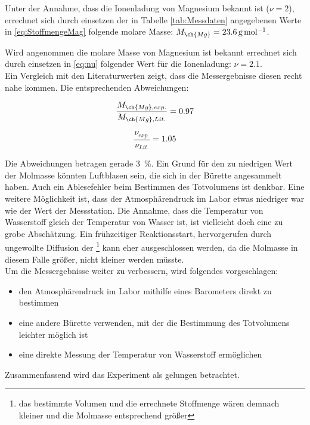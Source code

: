 \documentclass{article}
\begin{document}
    Unter der Annahme, dass die Ionenladung von Magnesium bekannt ist ($\nu=2$), errechnet sich durch einsetzen der in Tabelle \ref{tab:Messdaten} angegebenen Werte in \ref{eq:StoffmengeMag} folgende molare Masse: $M_{\ch{Mg}}=\SI[mode=text]{23.6}{\gram\per\mole}$.
    
    Wird angenommen die molare Masse von Magnesium ist bekannt errechnet sich durch einsetzen in \ref{eq:nu} folgender Wert für die Ionenladung: $\nu=2.1$. \\
    
    Ein Vergleich mit den Literaturwerten zeigt, dass die Messergebnisse diesen recht nahe kommen. Die entsprechenden Abweichungen: 
    
    \begin{equation}
      \frac{M_{\ch{Mg},exp.}}{M_{\ch{Mg},Lit.}}=0.97
    \end{equation}
      
    \begin{equation}
      \frac{\nu_{exp.}}{\nu_{Lit.}}=1.05
    \end{equation}
    
    Die Abweichungen betragen gerade \SI[mode=text]{3}{\percent}. Ein Grund für den zu niedrigen Wert der Molmasse könnten Luftblasen sein, die sich in der Bürette angesammelt haben. Auch ein Ablesefehler beim Bestimmen des Totvolumens ist denkbar. Eine weitere Möglichkeit ist, dass der Atmosphärendruck im Labor etwas niedriger war wie der Wert der Messstation. Die Annahme, dass die Temperatur von Wasserstoff gleich der Temperatur von Wasser ist, ist vielleicht doch eine zu grobe Abschätzung. Ein frühzeitiger Reaktionsstart, hervorgerufen durch ungewollte Diffusion der \footnote{das bestimmte Volumen und die errechnete Stoffmenge wären demnach kleiner und die Molmasse entsprechend größer} kann eher ausgeschlossen werden, da die Molmasse in diesem Falle größer, nicht kleiner werden müsste. \\
    
    Um die Messergebnisse weiter zu verbessern, wird folgendes vorgeschlagen:
    
    \begin{itemize}
      \item den Atmosphärendruck im Labor mithilfe eines Barometers direkt zu bestimmen
      \item eine andere Bürette verwenden, mit der die Bestimmung des Totvolumens leichter möglich ist
      \item eine direkte Messung der Temperatur von Wasserstoff ermöglichen
    \end{itemize}
    
     Zusammenfassend wird das Experiment als gelungen betrachtet.
     
  \pagebreak
  
  \listofreactions
  \printbibliography[title=Literaturverzeichnis]
  \listoffigures
  \listoftables
  
\end{document}
